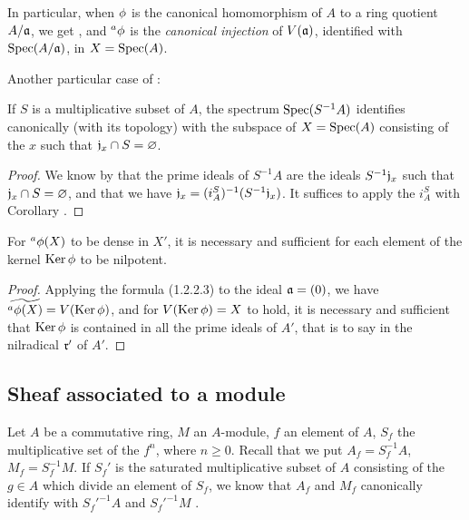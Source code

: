 \begin{env}[1.2.5]
\label{1.1.2.5}
In particular, when $\phi$ is the canonical homomorphism of $A$ to a ring quotient
$A/\mathfrak{a}$, we get , and ${}^a\phi$ is the
\emph{canonical injection} of $V(\mathfrak{a})$, identified with ${\mathop{\mathrm{Spec}}\nolimits}(A/\mathfrak{a})$,
in $X={\mathop{\mathrm{Spec}}\nolimits}(A)$.
\end{env}

Another particular case of :
\begin{cor}[1.2.6]
\label{1.1.2.6}
If $S$ is a multiplicative subset of $A$, the spectrum ${\mathop{\mathrm{Spec}}\nolimits}(S^{-1}A)$ identifies
canonically (with its topology) with the subspace of $X={\mathop{\mathrm{Spec}}\nolimits}(A)$ consisting of the $x$
such that $\mathfrak{j}_x\cap S=\varnothing$.
\end{cor}

\begin{proof}
\label{proof-1.1.2.6}
We know by  that the prime ideals of $S^{-1}A$ are the ideals
$S^{-1}\mathfrak{j}_x$ such that $\mathfrak{j}_x\cap S=\varnothing$, and that we have
$\mathfrak{j}_x=(i_A^S)^{-1}(S^{-1}\mathfrak{j}_x)$. It suffices to apply the $i_A^S$
with Corollary .
\end{proof}

\begin{cor}[1.2.7]
\label{1.1.2.7}
For ${}^a\phi(X)$ to be dense in $X'$, it is necessary and sufficient for each element
of the kernel ${\mathop{\mathrm{Ker}}\nolimits}\,\phi$ to be nilpotent.
\end{cor}

\begin{proof}
\label{proof-1.1.2.7}
Applying the formula (1.2.2.3) to the ideal $\mathfrak{a}=(0)$, we have
$\widetilde{{}^a\phi(X)}=V({\mathop{\mathrm{Ker}}\nolimits}\,\phi)$, and for $V({\mathop{\mathrm{Ker}}\nolimits}\,\phi)=X$ to hold, it is necessary
and sufficient that ${\mathop{\mathrm{Ker}}\nolimits}\,\phi$ is contained in all the prime ideals of $A'$, that is to say
in the nilradical $\mathfrak{r}'$ of $A'$.
\end{proof}

\subsection{Sheaf associated to a module}
\label{subsection-assoc-sheaf}

\begin{env}[1.3.1]
\label{1.1.3.1}
Let $A$ be a commutative ring, $M$ an $A$-module, $f$ an element of $A$, $S_f$ the
multiplicative set of the $f^n$, where $n\geqslant 0$. Recall that we put $A_f=S_f^{-1}A$,
$M_f=S_f^{-1}M$. If $S_f'$ is the saturated multiplicative subset of $A$ consisting of the
$g\in A$ which divide an element of $S_f$, we know that $A_f$ and $M_f$ canonically identify
with ${S_f'}^{-1}A$ and ${S_f'}^{-1}M$ .
\end{env}

